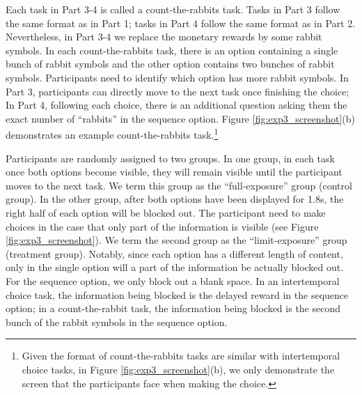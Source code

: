 \documentclass[
  12pt,
]{article}
\begin{document}
Each task in Part 3-4 is called a count-the-rabbits task. Tasks in Part
3 follow the same format as in Part 1; tasks in Part 4 follow the same
format as in Part 2. Nevertheless, in Part 3-4 we replace the monetary
rewards by some rabbit symbols. In each count-the-rabbits task, there is
an option containing a single bunch of rabbit symbols and the other
option contains two bunches of rabbit symbols. Participants need to
identify which option has more rabbit symbols. In Part 3, participants
can directly move to the next task once finishing the choice; In Part 4,
following each choice, there is an additional question asking them the
exact number of ``rabbits'' in the sequence option. Figure
\ref{fig:exp3_screenshot}(b) demonstrates an example count-the-rabbits
task.\footnote{Given the format of count-the-rabbits tasks are similar
  with intertemporal choice tasks, in Figure
  \ref{fig:exp3_screenshot}(b), we only demonstrate the screen that the
  participants face when making the choice.}

Participants are randomly assigned to two groups. In one group, in each
task once both options become visible, they will remain visible until
the participant moves to the next task. We term this group as the
``full-exposure'' group (control group). In the other group, after both
options have been displayed for 1.8s, the right half of each option will
be blocked out. The participant need to make choices in the case that
only part of the information is visible (see Figure
\ref{fig:exp3_screenshot}). We term the second group as the
``limit-exposure'' group (treatment group). Notably, since each option
has a different length of content, only in the single option will a part
of the information be actually blocked out. For the sequence option, we
only block out a blank space. In an intertemporal choice task, the
information being blocked is the delayed reward in the sequence option;
in a count-the-rabbit task, the information being blocked is the second
bunch of the rabbit symbols in the sequence option.
\end{document}
